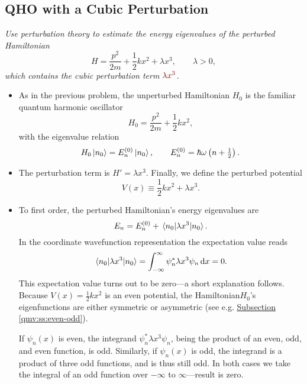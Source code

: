 \documentclass[11pt, a4paper]{article}
\newcommand{\dmath}[1]{\textcolor{Maroon}{#1}}  %
\newcommand{\diff}{\mathop{}\!\mathrm{d}} %
\newcommand{\Ham}{Hamiltonian\xspace}
\begin{document}
\subsection{QHO with a Cubic Perturbation}
\textit{Use perturbation theory to estimate the energy eigenvalues of the perturbed Hamiltonian}
\begin{equation*}
	H = \frac{p^{2}}{2m} + \frac{1}{2}kx^{2} + \lambda x^{3}, \qquad \lambda > 0,
\end{equation*}
\textit{which contains the cubic perturbation term $ \dmath{\lambda x^{3}} $.}
\begin{itemize}
	\item As in the previous problem, the unperturbed Hamiltonian $ H_{0} $ is the familiar quantum harmonic oscillator
	\begin{equation*}
		H_{0} = \frac{p^{2}}{2m} + \frac{1}{2}kx^{2},
	\end{equation*}
	with the eigenvalue relation
	\begin{equation*}
		H_{0}\ket{n_{0}} = E^{(0)}_{n} \ket{n_{0}}, \qquad E^{(0)}_{n} = \hbar \omega \left(n + \tfrac{1}{2}\right).
	\end{equation*}
	
	\item The perturbation term is $ H' = \lambda x^{3} $. Finally, we define the perturbed potential
	\begin{equation*}
		V(x) \equiv \frac{1}{2}kx^{2} + \lambda x^{3}.
	\end{equation*}
	
	\item To first order, the perturbed \Ham's energy eigenvalues are
	\begin{equation*}
		E_{n} = E^{(0)}_{n} + \mel{n_{0}}{\lambda x^{3}}{n_{0}}.
	\end{equation*}
	In the coordinate wavefunction representation the expectation value reads
	\begin{equation*}
		\mel{n_{0}}{\lambda x^{3}}{n_{0}} = \int_{-\infty}^{\infty}\psi_{n}^{*}\lambda x^{3}\psi_{n}\diff x = 0.
	\end{equation*}
	This expectation value turns out to be zero---a short explanation follows. Because $ V(x) = \frac{1}{2}kx^{2} $ is an even potential, the \Ham $ H_{0} $'s eigenfunctions are either symmetric or asymmetric (see e.g. \hyperref[qmv:ss:even-odd]{Subsection \ref{qmv:ss:even-odd}}).
	
	If $ \psi_{n}(x) $ is even, the integrand $ \psi_{n}^{*}\lambda x^{3}\psi_{n} $, being the product of an even, odd, and even function, is odd. Similarly, if $ \psi_{n}(x) $ is odd, the integrand is a product of three odd functions, and is thus still odd. In both cases we take the integral of an odd function over $ -\infty $ to $ \infty $---result is zero. 
	

\end{itemize}
\end{document}
